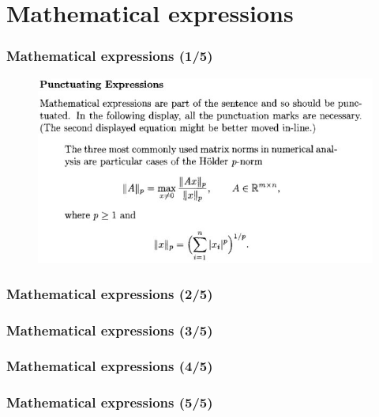 \documentclass{beamer}
\begin{document}
\section{Mathematical expressions}
\begin{frame}
\frametitle{Mathematical expressions (1/5)}
\begin{figure}[t]
 \includegraphics[width=\textwidth]{images/punct.jpeg}
\end{figure}
\end{frame}
\begin{frame}
\frametitle{Mathematical expressions (2/5)}
\end{frame}
\begin{frame}
\frametitle{Mathematical expressions (3/5)}
\end{frame}
\begin{frame}
\frametitle{Mathematical expressions (4/5)}
\end{frame}
\begin{frame}
\frametitle{Mathematical expressions (5/5)}
\end{frame}
\end{document}

